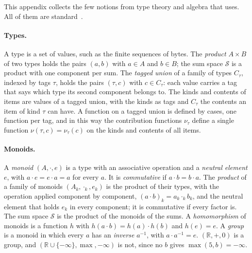 
This appendix collects the few notions from type theory and algebra that  uses. All of them are
standard~\cite{pierce2002types,hutton1999tutorial}.

\paragraph{Types.} A type is a set of values, such as the finite sequences of bytes. The \emph{product} $A \times B$
of two types holds the pairs $(a, b)$ with $a \in A$ and $b \in B$; the sum space $\mathcal{S}$ is a product with one
component per sum. The \emph{tagged union} of a family of types $C_\tau$, indexed by tags $\tau$, holds the pairs
$(\tau, c)$ with $c \in C_\tau$: each value carries a tag that says which type its second component belongs to. The
kinds and contents of items are values of a tagged union, with the kinds as tags and $C_\tau$ the contents an item of
kind $\tau$ can have. A function on a tagged union is defined by cases, one function per tag, and in this way the
contribution functions $\nu_\tau$ define a single function $\nu(\tau, c) = \nu_\tau(c)$ on the kinds and contents of
all items.

\paragraph{Monoids.} A \emph{monoid} $(A, \cdot, e)$ is a type with an associative operation and a \emph{neutral
element} $e$, with $a \cdot e = e \cdot a = a$ for every $a$. It is \emph{commutative} if $a \cdot b = b \cdot a$.
The \emph{product} of a family of monoids $(A_k, \cdot_k, e_k)$ is the product of their types, with the operation
applied component by component, $(a \cdot b)_k = a_k \cdot_k b_k$, and the neutral element that holds $e_k$ in
every component; it is commutative if every factor is. The sum space $\mathcal{S}$ is the product of the monoids of the sums. A
\emph{homomorphism} of monoids is a function $h$ with $h(a \cdot b) = h(a) \cdot h(b)$ and $h(e) = e$. A \emph{group}
is a monoid in which every $a$ has an \emph{inverse} $a^{-1}$, with $a \cdot a^{-1} = e$. $(\mathbb{R}, +, 0)$ is a
group, and $(\mathbb{R} \cup \{-\infty\}, \max, -\infty)$ is not, since no $b$ gives $\max(5, b) = -\infty$.

